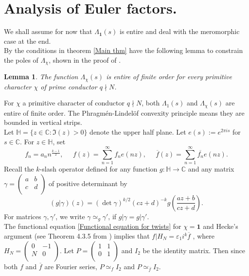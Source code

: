 \documentclass[a4paper,12.5pt]{amsart}
\newtheorem{lem}[thm]{Lemma}
\theoremstyle{definition}
\theoremstyle{remark}
\begin{document}
\section{Analysis of Euler factors.}
We shall assume for now that $\Lambda_{\mathbf{1}} (s)$ is entire and deal with the meromorphic case at the end. \\
By the conditions in theorem \ref{Main thm} have the following lemma to constrain the poles of $\Lambda_{\chi}$, shown in the proof of  \cite[ Theorem 1.1]{booker2014weil}.  
\begin{lem}{\label{Twists are entire}}
The function $\Lambda_{\chi} (s)$ is entire of finite order for every primitive character $\chi$ of prime conductor $q \nmid N$. 
\end{lem}
For $ \chi$ a primitive character of conductor $q \nmid N$, both $\Lambda_1 (s)$ and $\Lambda_{\chi}(s)$  are entire of finite order. The Phragm\'en-Lindel\"of convexity principle means they are bounded in vertical strips. \\
Let $\mathbb{H}= \{  z \in \mathbb{C}: \Im(z)>0     \}$ denote the upper half plane. Let $e(s):= e^{ 2 \pi i s}$ for $s \in \mathbb{C}$.  For $z \in \mathbb{H}$, set 
\[  f_n= a_n n^{\frac{k-1}{2}},  \; \; \; \; \;     f(z)=  \sum_{n=1}^{\infty} f_n  e(nz), \; \; \; \; \;                  \overline{f}(z) = \sum_{n=1}^{\infty} \overline{f_n}  e(nz)    .       \]
Recall the $k$-slash operator defined for any function $g: \mathbb{H} \rightarrow \mathbb{C}$ and any matrix $ \gamma= \begin{pmatrix}
a & b \\
c & d \\
\end{pmatrix}  $  of positive determinant by 
\[  (g| \gamma) (z) = (\det \gamma)^{k/2} (cz+d)^{-k} g\left(   \frac{az+b}{cz+d}  \right)      .    \]  For matrices $\gamma, \gamma'$, we write  $\gamma \simeq_{g} \gamma'$, if $ g|\gamma= g|\gamma'$. \\ 
The functional equation  \eqref{Functional equation for twists} for $\chi= \mathbf{1}$ and Hecke's argument (see Theorem 4.3.5 from \cite{miyake2006modular})  
implies that $ f| H_N = \varepsilon_1 i^k \overline{f}$ , where $ H_N= \begin{pmatrix}
0 & -1 \\
N & 0 \\
\end{pmatrix}   $. Let $ P=\begin{pmatrix}
1 & 1 \\
0 & 1 \\  \end{pmatrix} $ and $I_2$ be the identity matrix. Then since both $f$ and $\overline{f}$ are Fourier series, 
$P \simeq_{f} I_2$ and $P \simeq_{\overline{f}} I_2$.  \\
\end{document}
